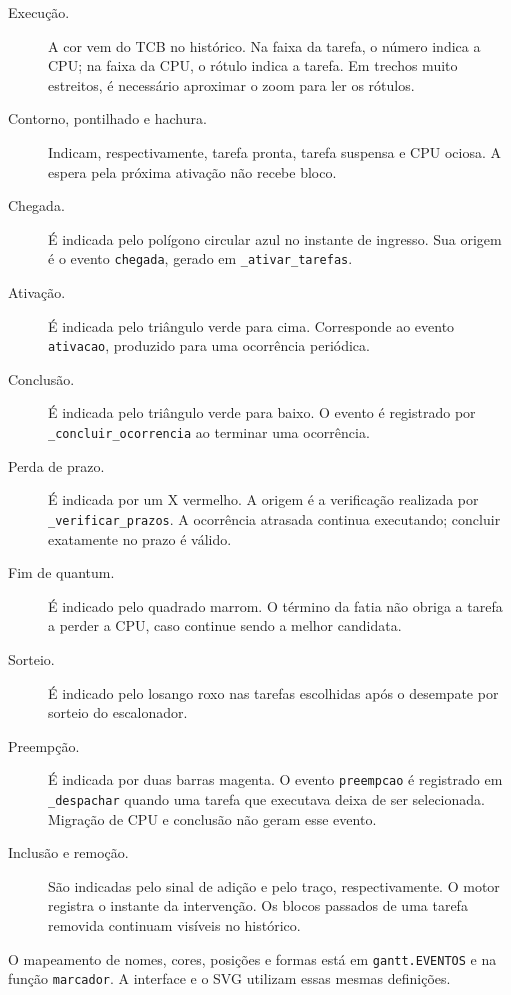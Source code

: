 \documentclass[a4paper]{article}
\begin{document}
\begin{description}
    \item[Execução.] A cor vem do TCB no histórico. Na faixa da tarefa, o número
    indica a CPU; na faixa da CPU, o rótulo indica a tarefa. Em trechos muito
    estreitos, é necessário aproximar o zoom para ler os rótulos.
    \item[Contorno, pontilhado e hachura.] Indicam, respectivamente, tarefa pronta,
    tarefa suspensa e CPU ociosa. A espera pela próxima ativação não recebe bloco.
    \item[Chegada.] É indicada pelo polígono circular azul no instante de ingresso.
    Sua origem é o evento \texttt{chegada}, gerado em \texttt{\_\allowbreak{}ativar\_\allowbreak{}tarefas}.
    \item[Ativação.] É indicada pelo triângulo verde para cima. Corresponde ao
    evento \texttt{ativacao}, produzido para uma ocorrência periódica.
    \item[Conclusão.] É indicada pelo triângulo verde para baixo. O evento é
    registrado por \texttt{\_\allowbreak{}concluir\_\allowbreak{}ocorrencia} ao terminar uma ocorrência.
    \item[Perda de prazo.] É indicada por um X vermelho. A origem é a verificação
    realizada por \texttt{\_\allowbreak{}verificar\_\allowbreak{}prazos}. A ocorrência atrasada continua
    executando; concluir exatamente no prazo é válido.
    \item[Fim de quantum.] É indicado pelo quadrado marrom. O término da fatia
    não obriga a tarefa a perder a CPU, caso continue sendo a melhor candidata.
    \item[Sorteio.] É indicado pelo losango roxo nas tarefas escolhidas após o
    desempate por sorteio do escalonador.
    \item[Preempção.] É indicada por duas barras magenta. O evento
    \texttt{preempcao} é registrado em \texttt{\_\allowbreak{}despachar} quando uma tarefa que
    executava deixa de ser selecionada. Migração de CPU e conclusão não geram
    esse evento.
    \item[Inclusão e remoção.] São indicadas pelo sinal de adição e pelo traço,
    respectivamente. O motor registra o instante da intervenção. Os blocos
    passados de uma tarefa removida continuam visíveis no histórico.
\end{description}

O mapeamento de nomes, cores, posições e formas está em \texttt{gantt.\allowbreak{}EVENTOS}
e na função \texttt{marcador}. A interface e o SVG utilizam essas mesmas definições.
\end{document}
